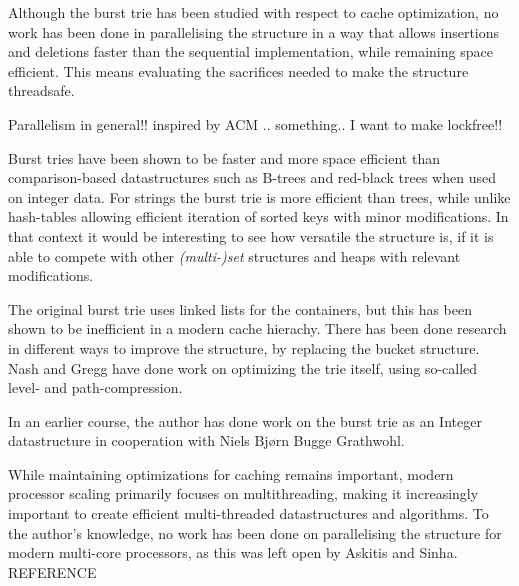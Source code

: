 Although the burst trie has been studied with respect to cache optimization, no
work has been done in parallelising the structure in a way that allows
insertions and deletions faster than the sequential implementation, while
remaining space efficient\cite{Askitis2010}. This means evaluating the sacrifices needed to make
the structure threadsafe.

Parallelism in general!!
inspired by ACM .. something.. I want to make lockfree!!



Burst tries have been shown to be faster and more space efficient than
compari\-son-based datastructures such as B-trees and red-black trees
when used on integer data.
For strings the burst trie is more efficient than trees, while unlike
hash-tables allowing efficient iteration of sorted keys with minor modifications.
In that context it would be interesting to see how versatile the structure is,
if it is able to compete with other \textit{(multi-)set} structures and heaps with
relevant modifications.

The original burst trie uses linked lists for the containers, but this has been
shown to be inefficient in a modern cache hierachy. There has been done research
in different ways to improve the structure, by replacing the bucket structure.
Nash and Gregg have done work on optimizing the trie itself, using so-called
level- and path-compression.

In an earlier course, the author has done work on the burst trie as an Integer
datastructure in cooperation with Niels Bjørn Bugge Grathwohl.

While maintaining optimizations for caching remains important, modern processor
scaling primarily focuses on multithreading, making it increasingly important
to create efficient multi-threaded datastructures and algorithms.
To the author's knowledge, no work has been done on parallelising the structure
for modern multi-core processors, as this was left open by Askitis and Sinha. REFERENCE


